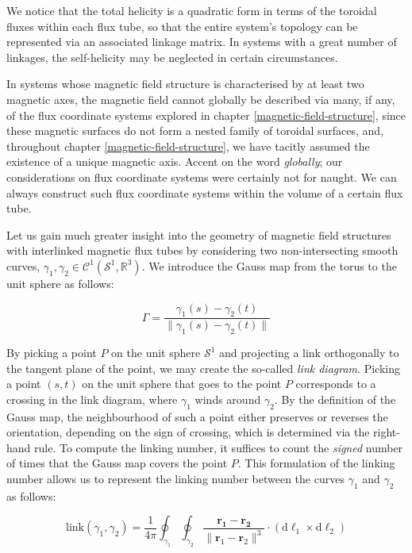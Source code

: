 We notice that the total helicity is a quadratic form in terms of the toroidal fluxes within each flux tube, so that the entire system's topology can be represented via an associated linkage matrix. In systems with a great number of linkages, the self-helicity may be neglected in certain circumstances.

\quad In systems whose magnetic field structure is characterised by at least two magnetic axes, the magnetic field cannot globally be described via many, if any, of the flux coordinate systems explored in chapter \ref{magnetic-field-structure}, since these magnetic surfaces do not form a nested family of toroidal surfaces, and, throughout chapter \ref{magnetic-field-structure}, we have tacitly assumed the existence of a unique magnetic axis. Accent on the word \textit{globally}; our considerations on flux coordinate systems were certainly not for naught. We can always construct such flux coordinate systems within the volume of a certain flux tube.

\quad Let us gain much greater insight into the geometry of magnetic field structures with interlinked magnetic flux tubes by considering two non-intersecting smooth curves, $\gamma_1,\gamma_2\in\mathcal{C}^1(\mathcal{S}^1,\mathbb{R}^3)$. We introduce the Gauss map from the torus to the unit sphere as follows:

\begin{equation}
    \Gamma=\frac{\gamma_1(s)-\gamma_2(t)}{\|\gamma_1(s)-\gamma_2(t)\|}
\end{equation}

By picking a point $P$ on the unit sphere $\mathcal{S}^1$ and projecting a link orthogonally to the tangent plane of the point, we may create the so-called \textit{link diagram}. Picking a point $(s,t)$ on the unit sphere that goes to the point $P$ corresponds to a crossing in the link diagram, where $\gamma_1$ winds around $\gamma_2$. By the definition of the Gauss map, the neighbourhood of such a point either preserves or reverses the orientation, depending on the sign of crossing, which is determined via the right-hand rule. To compute the linking number, it suffices to count the \textit{signed} number of times that the Gauss map covers the point $P$. This formulation of the linking number allows us to represent the linking number between the curves $\gamma_1$ and $\gamma_2$ as follows:

\begin{equation}
    \text{link}(\gamma_1,\gamma_2)=\frac{1}{4\pi}\oint_{\gamma_1}\oint_{\gamma_2}\frac{\mathbf{r_1-\mathbf{r}_2}}{\|\mathbf{r}_1-\mathbf{r}_2\|^3}\cdot\left(\mathrm{d}\boldsymbol{\ell}_1\times\mathrm{d}\boldsymbol{\ell}_2\right)
\end{equation}

